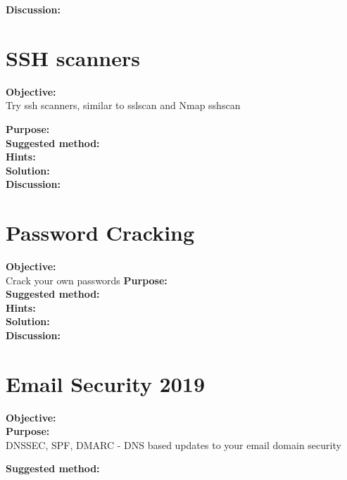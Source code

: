 \documentclass[a4paper,11pt,notitlepage]{report}
\begin{document}
{\bf Discussion:}\\


\chapter{SSH scanners}
\label{ex:nmap-ssh-scanner}

{\bf Objective:}\\

 Try ssh scanners, similar to sslscan and Nmap sshscan

{\bf Purpose:}\\


{\bf Suggested method:}\\


{\bf Hints:}\\


{\bf Solution:}\\


{\bf Discussion:}\\


\chapter{Password Cracking}
\label{ex:pwcrack-101}

{\bf Objective:}\\

Crack your own passwords
{\bf Purpose:}\\


{\bf Suggested method:}\\


{\bf Hints:}\\


{\bf Solution:}\\


{\bf Discussion:}\\




\chapter{Email Security 2019}
\label{ex:email-security}

{\bf Objective:}\\


{\bf Purpose:}\\

DNSSEC, SPF, DMARC - DNS based updates to your email domain security


{\bf Suggested method:}\\
\end{document}
